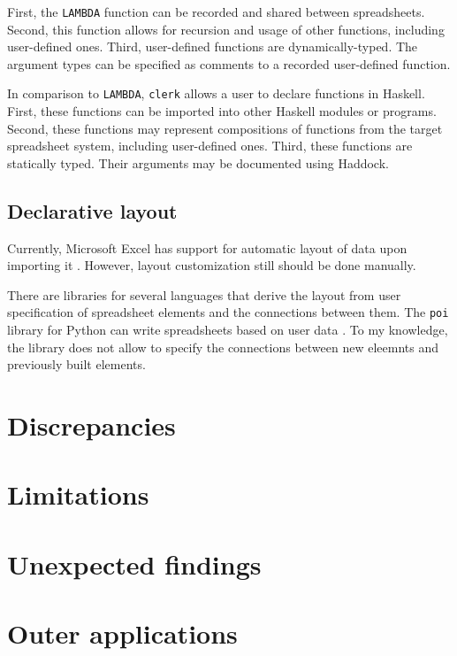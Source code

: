 First, the \texttt{LAMBDA} function can be recorded and shared between spreadsheets.
Second, this function allows for recursion and usage of other functions, including user-defined ones.
Third, user-defined functions are dynamically-typed.
The argument types can be specified as comments to a recorded user-defined function.

In comparison to \texttt{LAMBDA}, \texttt{clerk} allows a user to declare functions in Haskell.
First, these functions can be imported into other Haskell modules or programs.
Second, these functions may represent compositions of functions from the target spreadsheet system, including user-defined ones.
Third, these functions are statically typed. Their arguments may be documented using Haddock.

\subsection{Declarative layout}

Currently, Microsoft Excel has support for automatic layout of data upon importing it \cite{excel_custom_types}.
However, layout customization still should be done manually.

There are libraries for several languages that derive the layout from user specification of spreadsheet elements and the connections between them.
The \texttt{poi} library for Python can write spreadsheets based on user data \cite{wang_poi_nodate}.
To my knowledge, the library does not allow to specify the connections between new eleemnts and previously built elements.



\section{Discrepancies}
\label{eval:discrepancies}

\section{Limitations}
\label{eval:limitations}

\section{Unexpected findings}
\label{eval:unexpected}

\section{Outer applications}
\label{eval:outer-applications}

